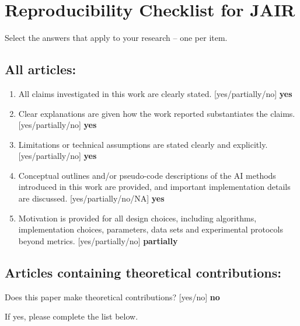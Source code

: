 \section{Reproducibility Checklist for JAIR}

Select the answers that apply to your research -- one per item.

\subsection*{All articles:}

\begin{enumerate}
    \item All claims investigated in this work are clearly stated.
    [yes/partially/no] \textbf{yes}
    \item Clear explanations are given how the work reported substantiates the claims.
    [yes/partially/no] \textbf{yes}
    \item Limitations or technical assumptions are stated clearly and explicitly.
    [yes/partially/no] \textbf{yes}
    \item Conceptual outlines and/or pseudo-code descriptions of the AI methods introduced in this work are provided, and important implementation details are discussed.
    [yes/partially/no/NA] \textbf{yes}
    \item
    Motivation is provided for all design choices, including algorithms, implementation choices, parameters, data sets and experimental protocols beyond metrics.
    [yes/partially/no] \textbf{partially}
\end{enumerate}

\subsection*{Articles containing theoretical contributions:}
Does this paper make theoretical contributions?
[yes/no] \textbf{no}

If yes, please complete the list below.


